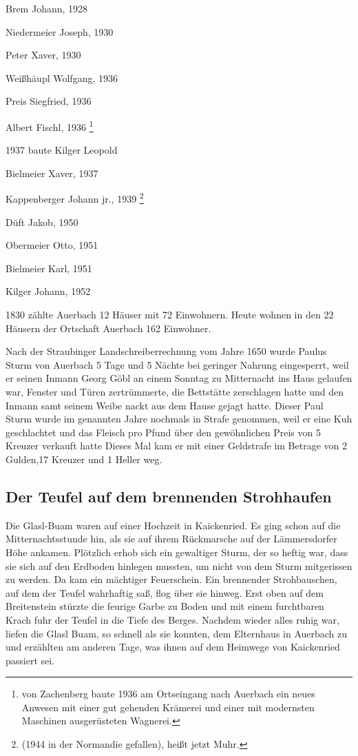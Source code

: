 \documentclass[12pt,a4pager]{book}
\begin{document}
\begin{compactitem}
\item Brem Johann, 1928
\item Niedermeier Joseph, 1930
\item Peter Xaver, 1930
\item Weißhäupl Wolfgang, 1936
\item Preis Siegfried, 1936
\item Albert Fischl, 1936 \footnote{von Zachenberg baute 1936 am Ortseingang nach
Auerbach ein neues Anwesen mit einer gut gehenden Krämerei und einer mit
modernsten Maschinen ausgerüsteten Wagnerei.}
\item 1937 baute Kilger Leopold
\item Bielmeier Xaver, 1937
\item Kappenberger Johann jr., 1939 \footnote{(1944 in der Normandie gefallen),
heißt jetzt Muhr.}
\item Düft Jakob, 1950
\item Obermeier Otto, 1951
\item Bielmeier Karl, 1951
\item Kilger Johann, 1952
\end{compactitem}

1830 zählte Auerbach 12 Häuser mit 72 Einwohnern. Heute wohnen in den 22 Häusern
der Ortschaft Auerbach 162 Einwohner.

Nach der Straubinger Landschreiberrechnung vom Jahre 1650 wurde Paulus Sturm von
Auerbach 5 Tage und 5 Nächte bei geringer Nahrung eingesperrt, weil er seinen
Inmann Georg Göbl an einem Sonntag zu Mitternacht ins Haus gelaufen war, Fenster
und Türen zertrümmerte, die Bettstätte zerschlagen hatte und den Inmann samt
seinem Weibe nackt aus dem Hause gejagt hatte. Dieser Paul Sturm wurde im
genannten Jahre nochmals in Strafe genommen, weil er eine Kuh geschlachtet und
das Fleisch pro Pfund über den gewöhnlichen Preis von 5 Kreuzer verkauft hatte
Dieses Mal kam er mit einer Geldstrafe im Betrage von 2 Gulden,17 Kreuzer und 1
Heller weg.

\subsection{Der Teufel auf dem brennenden Strohhaufen}

Die Glasl-Buam waren auf einer Hochzeit in Kaickenried. Es ging schon auf die
Mitternachtsstunde hin, als sie auf ihrem Rückmarsche auf der Lämmersdorfer Höhe
ankamen. Plötzlich erhob sich ein gewaltiger Sturm, der so heftig war, dass sie
sich auf den Erdboden hinlegen mussten, um nicht von dem Sturm mitgerissen zu
werden. Da kam ein mächtiger Feuerschein. Ein brennender Strohbauschen, auf dem
der Teufel wahrhaftig saß, flog über sie hinweg. Erst oben auf dem Breitenstein
stürzte die feurige Garbe zu Boden und mit einem furchtbaren Krach fuhr der
Teufel in die Tiefe des Berges. Nachdem wieder alles ruhig war, liefen die Glasl
Buam, so schnell als sie konnten, dem Elternhaus in Auerbach zu und erzählten am
anderen Tage, was ihnen auf dem Heimwege von Kaickenried passiert sei.
\end{document}
